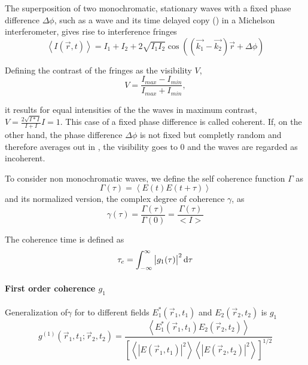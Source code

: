 The superposition of two monochromatic, stationary waves with a fixed phase difference $\Delta \phi$, such as a wave and its time delayed copy () in a Michelson interferometer, gives rise to interference fringes
\begin{equation}
	\left<I(\vec{r},t)\right>=I_1+I_2+2\sqrt{I_1I_2}\cos\left((\vec{k_1}-\vec{k_2})\vec{r}+\Delta \phi\right)
\label{eq:interference}
\end{equation}

Defining the contrast of the fringes as the visibility $V$,
\begin{equation}
	V=\frac{I_{max}-I_{min}}{I_{max}+I_{min}} ,
\end{equation} 

it results for equal intensities of the the waves in maximum contrast,  $V=\frac{2\sqrt{I*I}}{I+I}I=1$. This case of a fixed phase difference is called coherent.
If, on the other hand, the phase difference $\Delta \phi$ is not fixed but completly random and therefore averages out in , the visibility goes to 0 and the waves are regarded as incoherent.

To consider non monochromatic waves, we define the self coherence function $\Gamma$ as 
\begin{equation}
\Gamma(\tau)=\left< E(t)E(t+\tau)\right>
\end{equation}
and its normalized version, the complex degree of coherence $\gamma$, as
\begin{equation}
\gamma(\tau)=\frac{\Gamma(\tau)}{\Gamma(0)} =  \frac{\Gamma(\tau)}{<I>}
\end{equation}


The coherence time is defined as 
\begin{equation}
\tau_c = \int_{-\infty}^{\infty} \left| g_1(\tau)\right|^2 \operatorname{\mathrm{d}\!} \tau 
\end{equation}





\paragraph{First order coherence $g_1$}
Generalization of$\gamma$  for to different fields  $E_1^*(\vec{r}_1,t_1)$ and $E_2(\vec{r}_2,t_2)$ is $g_1$
\begin{equation}
	g^{(1)}(\vec{r}_1,t_1;\vec{r}_2,t_2)= \frac
	{\left< E_1^*(\vec{r}_1,t_1)E_2(\vec{r}_2,t_2) \right>}
	{\left[ \left<\left | E(\vec{r}_1,t_1)\right |^2 \right> \left< \left |E(\vec{r}_2,t_2)\right |^2 \right>\right]^{1/2}}	
\end{equation}






